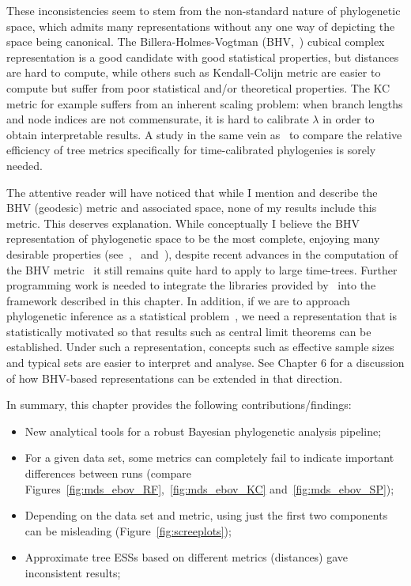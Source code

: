 These inconsistencies seem to stem from the non-standard nature of phylogenetic space, which admits many representations without any one way of depicting the space being canonical.
The Billera-Holmes-Vogtman (BHV,~\cite{Billera2001}) cubical complex representation is a good candidate with good statistical properties, but distances are hard to compute, while others such as Kendall-Colijn metric are easier to compute but suffer from poor statistical and/or theoretical properties.
The KC metric for example suffers from an inherent scaling problem: when branch lengths and node indices are not commensurate, it is hard to calibrate $\lambda$ in order to obtain interpretable results.
A study in the same vein as~\citep{Kuhner2014} to compare the relative efficiency of tree metrics specifically for time-calibrated phylogenies is sorely needed.

The attentive reader will have noticed that while I mention and describe the BHV (geodesic) metric and associated space, none of my results include this metric.
This deserves explanation.
While conceptually I believe the BHV representation of phylogenetic space to be the most complete, enjoying many desirable properties (see~\cite{Billera2001},~\cite{StJohn2017} and~\cite{Dinh2016}), despite recent advances in the computation of the BHV metric~\citep{Owen2011} it still remains quite hard to apply to large time-trees.
Further programming work is needed to integrate the libraries provided by~\citep{Owen2011} into the framework described in this chapter.
In addition, if we are to approach phylogenetic inference as a statistical problem~\citep{Holland2013}, we need a representation that is statistically motivated so that results such as central limit theorems can be established.
Under such a representation, concepts such as effective sample sizes and typical sets are easier to interpret and analyse.
See Chapter 6 for a discussion of how BHV-based representations can be extended in that direction.

In summary, this chapter provides the following contributions/findings:
\begin{itemize}
 \item New analytical tools for a robust Bayesian phylogenetic analysis pipeline;
 \item For a given data set, some metrics can completely fail to indicate important differences between runs (compare Figures~\ref{fig:mds_ebov_RF},~\ref{fig:mds_ebov_KC} and~\ref{fig:mds_ebov_SP});
 \item Depending on the data set and metric, using just the first two components can be misleading (Figure~\ref{fig:screeplots});
 \item Approximate tree ESSs based on different metrics (distances) gave inconsistent results;
\end{itemize}

